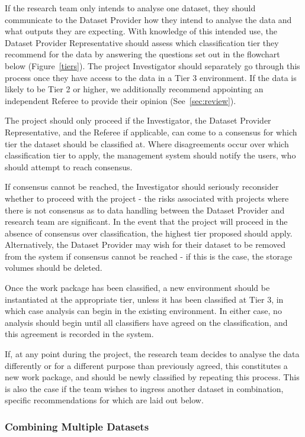 \documentclass[10pt,a4paper,twocolumn]{article}
\begin{document}
If the research team only intends to analyse one dataset, they should communicate to the Dataset Provider how they intend to analyse the data and what outputs they are expecting. With knowledge of this intended use, the Dataset Provider Representative should assess which classification tier they recommend for the data by answering the questions set out in the flowchart below (Figure~\ref{tiers}). The project Investigator should separately go through this process once they have access to the data in a Tier 3 environment. If the data is likely to be Tier 2 or higher, we additionally recommend appointing an independent Referee to provide their opinion (See~\ref{sec:review}).

The project should only proceed if the Investigator, the Dataset Provider Representative, and the Referee if applicable, can come to a consensus for which tier the dataset should be classified at. Where disagreements occur over which classification tier to apply, the management system should notify the users, who should attempt to reach consensus.

If consensus cannot be reached, the Investigator should seriously reconsider whether to proceed with the project - the risks associated with projects where there is not consensus as to data handling between the Dataset Provider and research team are significant.
In the  event that the project will proceed in the absence of consensus over classification, the highest tier proposed should apply. Alternatively, the Dataset Provider may wish for their dataset to be removed from the system if consensus cannot be reached - if this is the case, the storage volumes should be deleted.

Once the work package has been classified, a new environment should be instantiated at the appropriate tier, unless it has been classified at Tier 3, in which case analysis can begin in the existing environment. In either case, no analysis should begin until all classifiers have agreed on the classification, and this agreement is recorded in the system. 

If, at any point during the project, the research team decides to analyse the data differently or for a different purpose than previously agreed, this constitutes a new work package, and should be newly classified by repeating this process. This is also the case if the team wishes to ingress another dataset in combination, specific recommendations for which are laid out below. 

\subsubsection{Combining Multiple Datasets}
\end{document}
